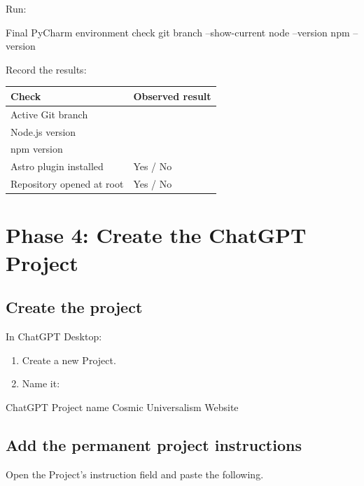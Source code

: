 \documentclass[11pt,letterpaper]{article}
\begin{document}
Run:

\begin{commandbox}{Final PyCharm environment check}
git branch --show-current
node --version
npm --version
\end{commandbox}

Record the results:

\begin{longtable}{L{2.2in}L{3.8in}}
\toprule
\textbf{Check} & \textbf{Observed result} \\
\midrule
Active Git branch & \\
Node.js version & \\
npm version & \\
Astro plugin installed & Yes / No \\
Repository opened at root & Yes / No \\
\bottomrule
\end{longtable}

\section{Phase 4: Create the ChatGPT Project}

\subsection{Create the project}

In ChatGPT Desktop:

\begin{enumerate}
    \item Create a new Project.
    \item Name it:
\end{enumerate}

\begin{codebox}{ChatGPT Project name}
Cosmic Universalism Website
\end{codebox}

\subsection{Add the permanent project instructions}

Open the Project's instruction field and paste the following.
\end{document}
